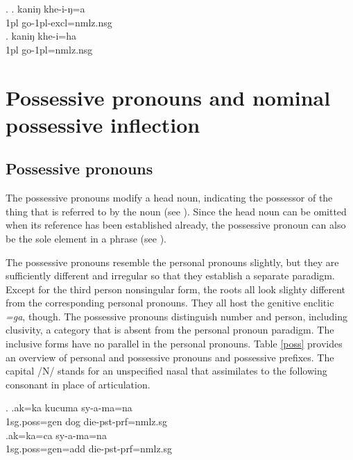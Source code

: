 \ex. \ag. 	kaniŋ khe-i-ŋ=a\\
			{\sc 1pl} go{\sc [pst]-1pl-excl=nmlz.nsg}\\
	\bg.	kaniŋ khe-i=ha\\
			{\sc 1pl} go{\sc [pst]-1pl=nmlz.nsg}\\


\section{Possessive pronouns and nominal possessive inflection}\label{poss-pron}

\subsection{Possessive pronouns}

The possessive pronouns modify a head noun, indicating the possessor of the thing that is referred to by the noun (see \Next[a]). Since the head noun can be omitted when its reference has been established already, the possessive pronoun can also be the sole element in a phrase (see \Next[b]). 

The possessive pronouns  resemble the personal pronouns slightly, but they are sufficiently different and irregular so that they establish a separate paradigm. Except for the third person nonsingular form, the roots all look slighty different from the corresponding personal pronouns.  They all host the genitive enclitic \emph{=ga}, though. The possessive pronouns distinguish number and person, including clusivity, a category that is  absent from the personal pronoun paradigm.  The inclusive forms have no parallel in the personal pronouns. Table \ref{poss} provides an overview of personal and possessive pronouns and possessive prefixes. The capital /N/ stands for an unspecified nasal that assimilates to the following consonant  in place of articulation.

\ex. \ag.ak=ka kucuma sy-a-ma=na\\
{\sc 1sg.poss=gen} dog die{\sc [3sg]-pst-prf=nmlz.sg}\\
\bg.ak=ka=ca sy-a-ma=na\\
{\sc 1sg.poss=gen=add}  die{\sc [3sg]-pst-prf=nmlz.sg}\\


